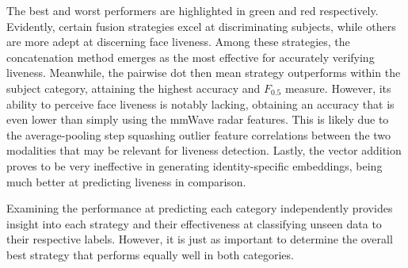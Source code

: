 \documentclass{mpaper}
\begin{document}
The best and worst performers are highlighted in green and red respectively. Evidently, certain fusion strategies excel at discriminating subjects, while others are more adept at discerning face liveness. Among these strategies, the concatenation method emerges as the most effective for accurately verifying liveness. Meanwhile, the pairwise dot then mean strategy outperforms within the subject category, attaining the highest accuracy and $F_{0.5}$ measure. However, its ability to perceive face liveness is notably lacking, obtaining an accuracy that is even lower than simply using the mmWave radar features. This is likely due to the average-pooling step squashing outlier feature correlations between the two modalities that may be relevant for liveness detection. Lastly, the vector addition proves to be very ineffective in generating identity-specific embeddings, being much better at predicting liveness in comparison. 

Examining the performance at predicting each category independently provides insight into each strategy and their effectiveness at classifying unseen data to their respective labels. However, it is just as important to determine the overall best strategy that performs equally well in both categories.

\begin{table}[h!]
    \centering
    \vspace{0.2cm}
    \caption{Averaged accuracy and $F_{0.5}$ score for the seven fusion strategies and non-hybrid models, applying equal weighting to subject and liveness predictions.}
    \label{tab:averaged_acc_fb}
    \vspace{-0.5cm}
\end{table}
\end{document}
